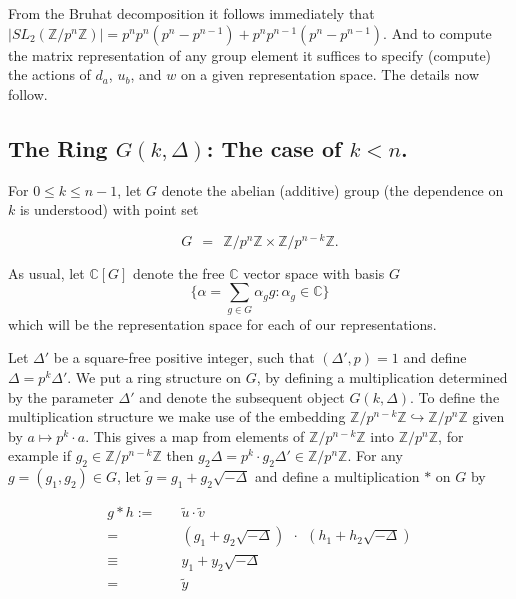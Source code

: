 \documentclass[12pt,reqno]{amsart}
\theoremstyle{remark}
\numberwithin{table}{section}
\newcommand{\C}{\mathbb C}
\newcommand{\Z}{\mathbb Z}
\begin{document}
From the Bruhat decomposition it follows immediately that $|SL_2(\Z/p^n \Z)| = p^np^n(p^n-p^{n-1}) + p^np^{n-1}(p^n-p^{n-1})$.  And to compute the matrix representation of any group element it suffices to specify (compute) the actions of $d_a$, $u_b$, and $w$ on a given representation space. The details now follow. 


\subsection{The Ring $G(k,\Delta)$: The case of $k<n$.}


For $0\leq k\leq n-1$, let  $G$ denote the abelian (additive) group (the dependence on $k$ is understood) with point set

\[ G \: \:  = \: \:  \Z/p^n \Z \times \Z/p^{n -k}  \Z. \]

As usual, let $\C[G]$ denote the free $\C$ vector space  with basis $G$  $$ \{\alpha = \sum_{g \in G} \alpha_g g:\alpha_g\in\C\}$$ which will be the representation space for each of our representations.

Let $\Delta'$  be a square-free positive integer, such that $(\Delta',p)=1$ and define $\Delta=p^k\Delta'$. We  put a ring structure on $G$, by defining a multiplication determined by the parameter $\Delta'$ and denote the subsequent object $G(k,\Delta)$. To define the multiplication structure we make use of the embedding $\Z/p^{n-k}\Z\hookrightarrow\Z/p^n\Z$ given by $a \mapsto p^k \cdot a$. This gives a map from elements of $\Z/p^{n-k}\Z$ into $\Z/p^n\Z$, for example if $g_2 \in \Z/p^{n-k} \Z$ then $g_2\Delta = p^k \cdot g_2 \Delta' \in \Z/p^n\Z$. For any $g = (g_1,g_2) \in G$, let $\widetilde{g} = g_1 + g_2 \sqrt{-\Delta}$ and define a multiplication $*$ on $G$ by 

\begin{align*}
g*h :=&\quad \widetilde{u} \cdot \widetilde{v} \\
 =&\quad \left(g_1 + g_2 \sqrt{-\Delta}\right) \: \:  \cdot \: \: \left(h_1 +  h_2 \sqrt{-\Delta} \right)\\
  \equiv&\quad y_1 +  y_2\sqrt{-\Delta} \\ %
  =& \quad \widetilde{y} \\ %
  \end{align*}
\end{document}
